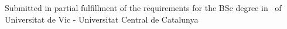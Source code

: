 \begin{titlepage}
\vfill %
Submitted in partial fulfillment of the requirements for the BSc degree in
\degreetype~of Universitat de Vic - Universitat Central de Catalunya\\[0.5cm]

\makeatletter
\@date 
\makeatother


\end{titlepage}
